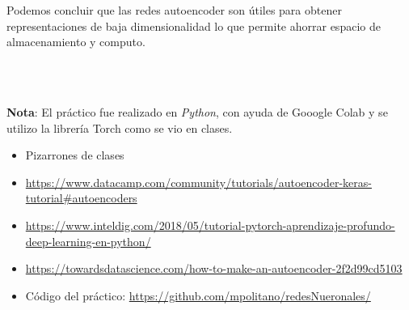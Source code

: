 \documentclass{article}
\begin{document}
Podemos concluir que las redes autoencoder son útiles para obtener representaciones de baja dimensionalidad lo que permite ahorrar espacio de almacenamiento y computo.

\\
\


\textbf{Nota}: El práctico fue realizado en \textit{Python}, con ayuda de Gooogle Colab y se utilizo la librería Torch como se vio en clases.
    



\begin{itemize}


\item Pizarrones de clases

\item \url{https://www.datacamp.com/community/tutorials/autoencoder-keras-tutorial#autoencoders}
\item \url{https://www.inteldig.com/2018/05/tutorial-pytorch-aprendizaje-profundo-deep-learning-en-python/}
\item \url{https://towardsdatascience.com/how-to-make-an-autoencoder-2f2d99cd5103}

\item Código del práctico:  \url{https://github.com/mpolitano/redesNueronales/ }

\end{itemize}
\end{document}
